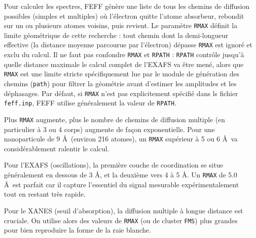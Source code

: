 \documentclass[12pt,a4paper,french]{book}
\begin{document}
Pour calculer les spectres, FEFF génère une liste de tous les chemins de diffusion possibles (simples et multiples) où l'électron quitte l'atome absorbeur, rebondit sur un ou plusieurs atomes voisins, puis revient.
Le paramètre \verb+RMAX+ définit la limite géométrique de cette recherche : tout chemin dont la demi-longueur effective (la distance moyenne parcourue par l'électron) dépasse \verb+RMAX+ est ignoré et exclu du calcul.
Il ne faut pas confondre \verb+RMAX+ et \verb+RPATH+ : \verb+RPATH+ contrôle jusqu'à quelle distance maximale le calcul complet de l'EXAFS va être mené, alors que \verb+RMAX+ est une limite stricte spécifiquement lue par le module de génération des chemins (\verb+path+) pour filtrer la géométrie avant d'estimer les amplitudes et les déphasages. Par défaut, si \verb+RMAX+ n'est pas explicitement spécifié dans ls fichier \verb+feff.inp+, FEFF utilise généralement la valeur de \verb+RPATH+.

Plus \verb+RMAX+ augmente, plus le nombre de chemins de diffusion multiple (en particulier à 3 ou 4 corps) augmente de façon exponentielle. Pour une nanoparticule de 9 \AA\ (environ 216 atomes), un \verb+RMAX+ supérieur à 5 ou 6 \AA\ va considérablement ralentir le calcul.

Pour l'EXAFS (oscillations), la première couche de coordination se situe généralement en dessous de 3 \AA, et la deuxième vers 4 à 5 \AA. Un \verb+RMAX+ de 5.0 \AA\ est parfait car il capture l'essentiel du signal mesurable expérimentalement tout en restant très rapide.  

Pour le XANES (seuil d'absorption), la diffusion multiple à longue distance est cruciale. On utilise alors des valeurs de \verb+RMAX+ (ou de cluster \verb+FMS+) plus grandes pour bien reproduire la forme de la raie blanche.  
\end{document}
